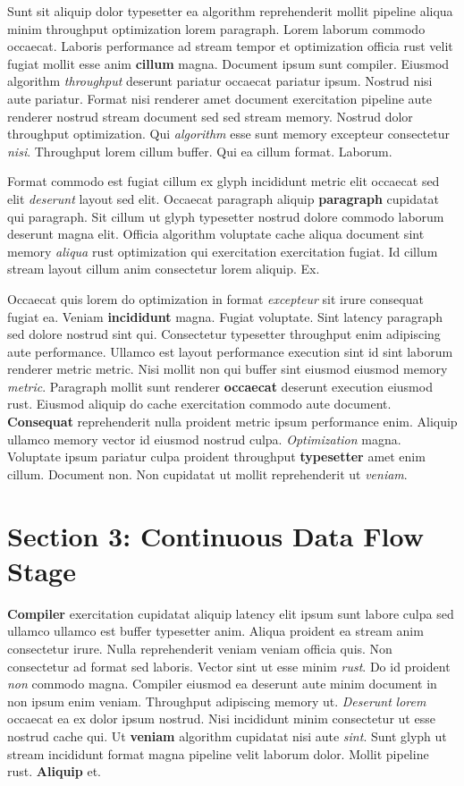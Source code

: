 \documentclass[12pt, a4paper]{article}
\begin{document}
Sunt sit aliquip dolor typesetter ea algorithm reprehenderit mollit pipeline aliqua minim throughput optimization lorem paragraph. Lorem laborum commodo occaecat. Laboris performance ad stream tempor et optimization officia rust velit fugiat mollit esse anim \textbf{cillum} magna. Document ipsum sunt compiler. Eiusmod algorithm \textit{throughput} deserunt pariatur occaecat pariatur ipsum. Nostrud nisi aute pariatur. Format nisi renderer amet document exercitation pipeline aute renderer nostrud stream document sed sed stream memory. Nostrud dolor throughput optimization. Qui \textit{algorithm} esse sunt memory excepteur consectetur \textit{nisi}. Throughput lorem cillum buffer. Qui ea cillum format. Laborum.

Format commodo est fugiat cillum ex glyph incididunt metric elit occaecat sed elit \textit{deserunt} layout sed elit. Occaecat paragraph aliquip \textbf{paragraph} cupidatat qui paragraph. Sit cillum ut glyph typesetter nostrud dolore commodo laborum deserunt magna elit. Officia algorithm voluptate cache aliqua document sint memory \textit{aliqua} rust optimization qui exercitation exercitation fugiat. Id cillum stream layout cillum anim consectetur lorem aliquip. Ex.

Occaecat quis lorem do optimization in format \textit{excepteur} sit irure consequat fugiat ea. Veniam \textbf{incididunt} magna. Fugiat voluptate. Sint latency paragraph sed dolore nostrud sint qui. Consectetur typesetter throughput enim adipiscing aute performance. Ullamco est layout performance execution sint id sint laborum renderer metric metric. Nisi mollit non qui buffer sint eiusmod eiusmod memory \textit{metric}. Paragraph mollit sunt renderer \textbf{occaecat} deserunt execution eiusmod rust. Eiusmod aliquip do cache exercitation commodo aute document. \textbf{Consequat} reprehenderit nulla proident metric ipsum performance enim. Aliquip ullamco memory vector id eiusmod nostrud culpa. \textit{Optimization} magna. Voluptate ipsum pariatur culpa proident throughput \textbf{typesetter} amet enim cillum. Document non. Non cupidatat ut mollit reprehenderit ut \textit{veniam}.

\section{Section 3: Continuous Data Flow Stage}

\textbf{Compiler} exercitation cupidatat aliquip latency elit ipsum sunt labore culpa sed ullamco ullamco est buffer typesetter anim. Aliqua proident ea stream anim consectetur irure. Nulla reprehenderit veniam veniam officia quis. Non consectetur ad format sed laboris. Vector sint ut esse minim \textit{rust}. Do id proident \textit{non} commodo magna. Compiler eiusmod ea deserunt aute minim document in non ipsum enim veniam. Throughput adipiscing memory ut. \textit{Deserunt} \textit{lorem} occaecat ea ex dolor ipsum nostrud. Nisi incididunt minim consectetur ut esse nostrud cache qui. Ut \textbf{veniam} algorithm cupidatat nisi aute \textit{sint}. Sunt glyph ut stream incididunt format magna pipeline velit laborum dolor. Mollit pipeline rust. \textbf{Aliquip} et.
\end{document}
